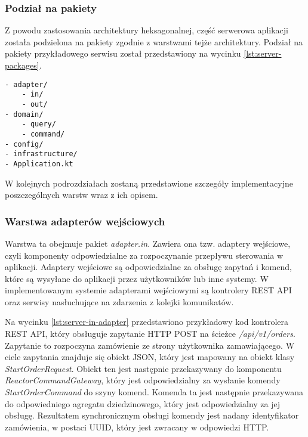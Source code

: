\subsubsection{Podział na pakiety}

Z powodu zastosowania architektury heksagonalnej, część serwerowa aplikacji została podzielona na pakiety zgodnie z warstwami tejże architektury. Podział na pakiety przykładowego serwisu został przedstawiony na wycinku \ref{lst:server-packages}.

\begin{lstlisting}[caption={Podział na pakiety części serwerowej projektu},label={lst:server-packages},captionpos=b]
- adapter/
    - in/
    - out/
- domain/
    - query/
    - command/
- config/
- infrastructure/
- Application.kt
\end{lstlisting}

W kolejnych podrozdziałach zostaną przedstawione szczegóły implementacyjne poszczególnych warstw wraz z ich opisem.

\subsubsection{Warstwa adapterów wejściowych} 

Warstwa ta obejmuje pakiet \textit{adapter.in}. Zawiera ona tzw. adaptery wejściowe, czyli komponenty odpowiedzialne za rozpoczynanie przepływu sterowania w aplikacji. Adaptery wejściowe są odpowiedzialne za obsługę zapytań i komend, które są wysyłane do aplikacji przez użytkowników lub inne systemy. W implementowanym systemie adapterami wejściowymi są kontrolery REST API oraz serwisy nasłuchujące na zdarzenia z kolejki komunikatów.

Na wycinku \ref{lst:server-in-adapter} przedstawiono przykładowy kod kontrolera REST API, który obsługuje zapytanie HTTP POST na ścieżce \textit{/api/v1/orders}. Zapytanie to rozpoczyna zamówienie ze strony użytkownika zamawiającego. W ciele zapytania znajduje się obiekt JSON, który jest mapowany na obiekt klasy \textit{StartOrderRequest}. Obiekt ten jest następnie przekazywany do komponentu \textit{ReactorCommandGateway}, który jest odpowiedzialny za wysłanie komendy \textit{StartOrderCommand} do szyny komend. Komenda ta jest następnie przekazywana do odpowiedniego agregatu dziedzinowego, który jest odpowiedzialny za jej obsługę. Rezultatem synchronicznym obsługi komendy jest nadany identyfikator zamówienia, w postaci UUID, który jest zwracany w odpowiedzi HTTP. 


